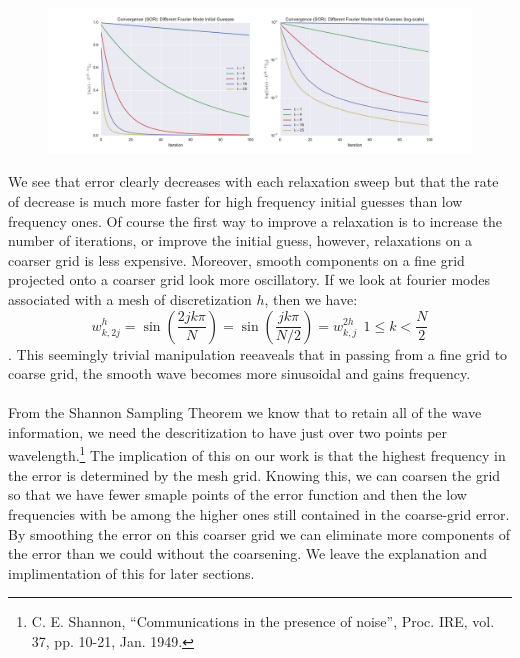 \documentclass[pdftex,12pt,a4paper]{article}
\begin{document}
    \begin{figure}[h]
	\centering
	\includegraphics[scale=0.4]{../plots/convergence_sor_diff_modes-motivation.pdf}
	\end{figure}

    We see that error clearly decreases with each relaxation sweep but that the rate of decrease is much more faster for high frequency initial guesses than low frequency ones.  Of course the first way to improve a relaxation is to increase the number of iterations, or improve the initial guess, however, relaxations on a coarser grid is less expensive.  Moreover, smooth components on a fine grid projected onto a coarser grid look more oscillatory.  If we look at fourier modes associated with a mesh of discretization $h$, then we have:
    $$w_{k, 2j}^h = \sin \left( \frac{2jk \pi}{N}\right) =  \sin \left( \frac{jk \pi}{N/2}\right) = w_{k, j}^{2h} ~~ 1 \leq k < \frac N 2 $$.  This seemingly trivial manipulation reeaveals that in passing from a fine grid to coarse grid, the smooth wave becomes more sinusoidal and gains frequency.  

    \paragraph*{} From the Shannon Sampling Theorem we know that to retain all of the wave information, we need the descritization to have just over two points per wavelength.\footnote{C. E. Shannon, ``Communications in the presence of noise'', Proc. IRE, vol. 37, pp. 10-21, Jan. 1949.} The implication of this on our work is that the highest frequency in the error is determined by the mesh grid. Knowing this, we can coarsen the grid so that we have fewer smaple points of the error function and then the low frequencies with be among the higher ones still contained in the coarse-grid error. By smoothing the error on this coarser grid we can eliminate more components of the error than we could without the coarsening. We leave the explanation and implimentation of this for later sections.
\end{document}
